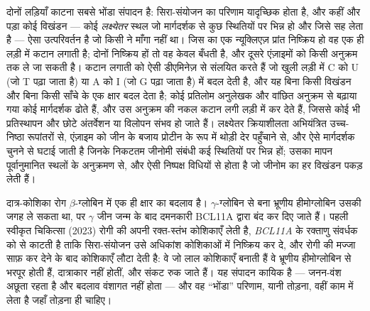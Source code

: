 \begin{proposition}[बिना विखंडन के संपादन]\label{prop:b3:genetic-engineering:editors}
दोनों लड़ियाँ काटना सबसे भोंडा संपादन है: सिरा-संयोजन का परिणाम
यादृच्छिक होता है, और कहीं और पड़ा कोई विखंडन --- कोई \emph{लक्ष्येतर}
स्थल जो मार्गदर्शक से कुछ स्थितियों पर भिन्न हो और जिसे  सह लेता है
--- ऐसा उत्परिवर्तन है जो किसी ने माँगा नहीं था। जिस  का एक
न्यूक्लिएज़ प्रांत निष्क्रिय हो वह एक ही लड़ी में कटान लगाती है; दोनों
निष्क्रिय हों तो वह केवल बँधती है, और दूसरे एंज़ाइमों को किसी अनुक्रम
तक ले जा सकती है। \emph{} कटान लगाती  को ऐसी
डीएमिनेज़ से संलयित करते हैं जो खुली लड़ी में C को U (जो T पढ़ा जाता
है) या A को I (जो G पढ़ा जाता है) में बदल देती है, और यह बिना किसी
विखंडन और बिना किसी साँचे के एक क्षार बदल देता है; \emph{}
कोई प्रतिलोम अनुलेखक और वांछित अनुक्रम से बढ़ाया गया कोई मार्गदर्शक
ढोते हैं, और उस अनुक्रम की नकल कटान लगी लड़ी में कर देते हैं, जिससे कोई
भी प्रतिस्थापन और छोटे अंतर्वेशन या विलोपन संभव हो जाते हैं।
लक्ष्येतर क्रियाशीलता अभियंत्रित उच्च-निष्ठा  रूपांतरों से,
एंज़ाइम को जीन के बजाय प्रोटीन के रूप में थोड़ी देर पहुँचाने से, और ऐसे
मार्गदर्शक चुनने से घटाई जाती है जिनके निकटतम जीनोमी संबंधी कई
स्थितियों पर भिन्न हों; उसका मापन पूर्वानुमानित स्थलों के अनुक्रमण से,
और ऐसी निष्पक्ष विधियों से होता है जो जीनोम का हर विखंडन पकड़ लेती हैं।
\end{proposition}

\begin{example}[एक इलाज]\label{ex:b3:genetic-engineering:sickle}
दात्र-कोशिका रोग $\beta$-ग्लोबिन में एक ही क्षार का बदलाव है।
$\gamma$-ग्लोबिन से बना भ्रूणीय हीमोग्लोबिन उसकी जगह ले सकता था, पर
$\gamma$ जीन जन्म के बाद दमनकारी BCL11A द्वारा बंद कर दिए जाते हैं।
पहली स्वीकृत  चिकित्सा (2023) रोगी की अपनी रक्त-स्तंभ कोशिकाएँ
लेती है, \emph{BCL11A} के रक्ताणु संवर्धक को  से काटती है ताकि
सिरा-संयोजन उसे अधिकांश कोशिकाओं में निष्क्रिय कर दे, और रोगी की मज्जा
साफ़ कर देने के बाद कोशिकाएँ लौटा देती है: वे जो लाल कोशिकाएँ बनाती हैं
वे भ्रूणीय हीमोग्लोबिन से भरपूर होती हैं, दात्राकार नहीं होतीं, और
संकट रुक जाते हैं। यह संपादन कायिक है --- जनन-वंश अछूता रहता है और
बदलाव वंशागत नहीं होता --- और वह ``भोंडा'' परिणाम, यानी तोड़ना, वहीं
काम में लेता है जहाँ तोड़ना ही चाहिए।
\end{example}

